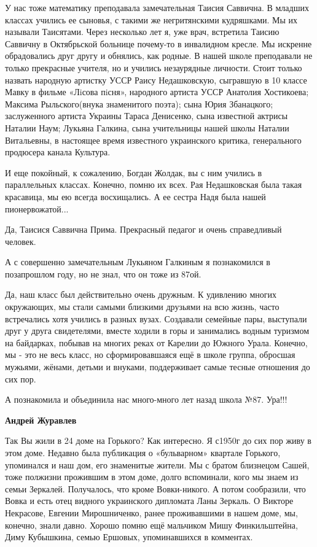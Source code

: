 \begin{itemize}
У нас тоже математику преподавала замечательная Таисия Саввична. В младших
классах учились ее сыновья, с такими же негритянскими кудряшками. Мы их
называли Таисятами. Через несколько лет я, уже врач, встретила Таисию Саввичну в
Октябрьской больнице почему-то в инвалидном кресле. Мы искренне обрадовались
друг другу и обнялись, как родные. В нашей школе преподавали не только
прекрасные учителя, но и учились незаурядные личности. Стоит только назвать
народную артистку УССР Раису Недашковскую, сыгравшую в 10 классе Мавку в фильме
«Лiсова пiсня», народного артиста УССР Анатолия Хостикоева; Максима
Рыльского(внука знаменитого поэта); сына Юрия Збанацкого; заслуженного артиста Украины Тараса Денисенко, сына
известной актрисы Наталии Наум; Лукьяна Галкина, сына учительницы нашей школы
Наталии Витальевны, в настоящее время известного украинского критика,
генерального продюсера канала Культура.

\begin{itemize} %

И еще покойный, к сожалению, Богдан Жолдак, вы с ним учились в параллельных
классах. Конечно, помню их всех. Рая Недашковская была такая красавица, мы ею
всегда восхищались. А ее сестра Надя была нашей пионервожатой...



Да, Таисися Саввична Прима. Прекрасный педагог и очень справедливый человек.

А с совершенно замечательным Лукьяном Галкиным я познакомился в позапрошлом
году, но не знал, что он тоже из 87ой.

\end{itemize} %


Да, наш класс был действительно очень дружным. К удивлению многих окружающих, мы
стали самыми близкими друзьями на всю жизнь, часто встречались хотя учились в
разных вузах. Создавали семейные пары, выступали друг у друга свидетелями,
вместе ходили в горы и занимались водным туризмом на байдарках, побывав на
многих реках от Карелии до Южного Урала. Конечно, мы - это не весь класс, но
сформировавшаяся ещё в школе группа, обросшая мужьями, жёнами, детьми и
внуками, поддерживает самые тесные отношения до сих пор.

А познакомила и объединила нас много-много лет назад школа №87. Ура!!!

\textbf{Андрей Журавлев}

Так Вы жили в 24 доме на Горького? Как интересно. Я с1950г до сих пор живу в
этом доме. Недавно была публикация о «бульварном» квартале Горького, упоминался
и наш дом, его знаменитые жители. Мы с братом близнецом Сашей, тоже полжизни
прожившим в этом доме, долго вспоминали, кого мы знаем из семьи Зеркалей.
Получалось, что кроме Вовки-никого. А потом сообразили, что Вовка и есть отец
видного украинского дипломата Ланы Зеркаль. О Викторе Некрасове, Евгении
Мирошниченко, ранее проживавшими в нашем доме, мы, конечно, знали давно. Хорошо
помню ещё мальчиком Мишу Финкильштейна, Диму Кубышкина, семью Ершовых,
упоминавшихся в комментах.


\end{itemize}
